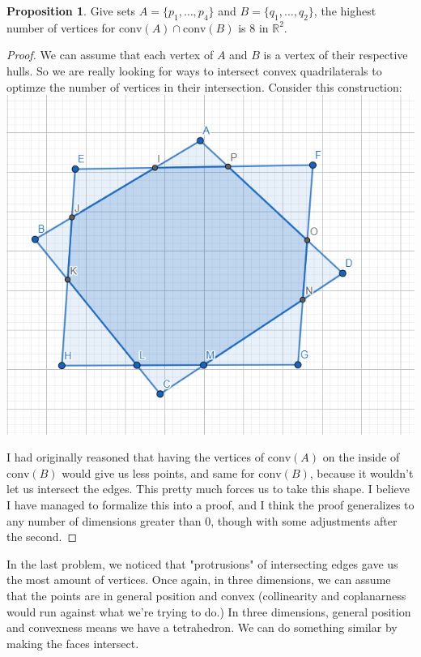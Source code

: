 \documentclass[12pt]{article}
\newcommand{\R}{\mathbb{R}}
\newcommand{\conv}[1]{\mbox{conv}(#1)}
\theoremstyle{definition}
\newtheorem{proposition}{Proposition}
\begin{document}
\begin{proposition}
Give sets $A = \{p_1,\dots, p_4\}$ and $B = \{q_1,\dots,q_2\}$, the highest number of vertices for $\conv{A}\cap \conv{B}$ is $8$ in $\R^2$.

\begin{proof}
We can assume that each vertex of $A$ and $B$ is a vertex of their respective hulls. So we are really looking for ways to intersect convex quadrilaterals to optimze the number of vertices in their intersection. Consider this construction: \\


\includegraphics[scale=0.5]{eight_vertices.png} 

I had originally reasoned that having the vertices of $\conv{A}$ on the inside of $\conv{B}$ would give us less points, and same for $\conv{B}$, because it wouldn't let us intersect the edges. This pretty much forces us to take this shape. I believe I have managed to formalize this into a proof, and I think the proof generalizes to any number of dimensions greater than $0$, though with some adjustments after the second.
\end{proof}



In the last problem, we noticed that "protrusions" of intersecting edges gave us the most amount of vertices. Once again, in three dimensions, we can assume that the points are in general position and convex (collinearity and coplanarness would run against what we're trying to do.) In three dimensions, general position and convexness means we have a tetrahedron. We can do something similar by making the faces intersect.\\



\end{proposition}
\end{document}
